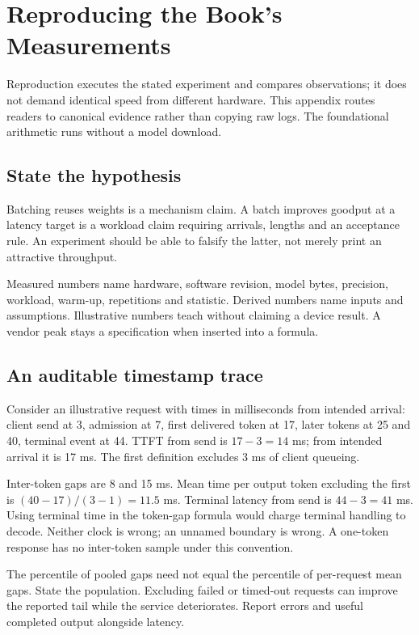 \chapter{Reproducing the Book's Measurements}\label{app:reproducing}
\begin{ChapterIntent}
Reproduction executes the stated experiment and compares observations;
it does not demand identical speed from different hardware. This appendix
routes readers to canonical evidence rather than copying raw logs.
The foundational arithmetic runs without a model download.
\end{ChapterIntent}

\section{State the hypothesis}
Batching reuses weights is a mechanism claim. A batch improves goodput
at a latency target is a workload claim requiring arrivals, lengths and
an acceptance rule. An experiment should be able to falsify the latter,
not merely print an attractive throughput.

Measured numbers name hardware, software revision, model bytes, precision,
workload, warm-up, repetitions and statistic. Derived numbers name inputs
and assumptions. Illustrative numbers teach without claiming a device
result. A vendor peak stays a specification when inserted into a formula.

\section{An auditable timestamp trace}
Consider an illustrative request with times in milliseconds from intended
arrival: client send at 3, admission at 7, first delivered token at 17,
later tokens at 25 and 40, terminal event at 44.
TTFT from send is $17-3=14$ ms; from intended arrival it is 17 ms.
The first definition excludes 3 ms of client queueing.

Inter-token gaps are 8 and 15 ms. Mean time per output token excluding
the first is $(40-17)/(3-1)=11.5$ ms.
Terminal latency from send is $44-3=41$ ms. Using terminal time in the
token-gap formula would charge terminal handling to decode. Neither clock
is wrong; an unnamed boundary is wrong. A one-token response has no
inter-token sample under this convention.

The percentile of pooled gaps need not equal the percentile of per-request
mean gaps. State the population. Excluding failed or timed-out requests
can improve the reported tail while the service deteriorates.
Report errors and useful completed output alongside latency.

